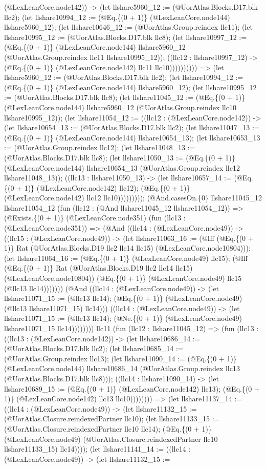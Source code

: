\documentclass[11pt]{article}
\begin{document}
(@LexLeanCore.node142)) -> (let llshare5960\_12 := (@UorAtlas.Blocks.D17.blk llc2); (let llshare10994\_12 := (@Eq.\{(0 + 1)\} (@LexLeanCore.node144) llshare5960\_12); (let llshare10646\_12 := (@UorAtlas.Group.reindex llc11); (let llshare10995\_12 := (@UorAtlas.Blocks.D17.blk llc8); (let llshare10997\_12 := (@Eq.\{(0 + 1)\} (@LexLeanCore.node144) llshare5960\_12 (@UorAtlas.Group.reindex llc11 llshare10995\_12)); ((llc12 : llshare10997\_12) -> (@Eq.\{(0 + 1)\} (@LexLeanCore.node142) llc11 llc10)))))))))) => (let llshare5960\_12 := (@UorAtlas.Blocks.D17.blk llc2); (let llshare10994\_12 := (@Eq.\{(0 + 1)\} (@LexLeanCore.node144) llshare5960\_12); (let llshare10995\_12 := (@UorAtlas.Blocks.D17.blk llc8); (let llshare11045\_12 := (@Eq.\{(0 + 1)\} (@LexLeanCore.node144) llshare5960\_12 (@UorAtlas.Group.reindex llc10 llshare10995\_12)); (let llshare11054\_12 := ((llc12 : (@LexLeanCore.node142)) -> (let llshare10654\_13 := (@UorAtlas.Blocks.D17.blk llc2); (let llshare11047\_13 := (@Eq.\{(0 + 1)\} (@LexLeanCore.node144) llshare10654\_13); (let llshare10653\_13 := (@UorAtlas.Group.reindex llc12); (let llshare11048\_13 := (@UorAtlas.Blocks.D17.blk llc8); (let llshare11050\_13 := (@Eq.\{(0 + 1)\} (@LexLeanCore.node144) llshare10654\_13 (@UorAtlas.Group.reindex llc12 llshare11048\_13)); ((llc13 : llshare11050\_13) -> (let llshare10657\_14 := (@Eq.\{(0 + 1)\} (@LexLeanCore.node142) llc12); (@Eq.\{(0 + 1)\} (@LexLeanCore.node142) llc12 llc10))))))))); (@And.casesOn.\{0\} llshare11045\_12 llshare11054\_12 (fun (llc12 : (@And llshare11045\_12 llshare11054\_12)) => (@Exists.\{(0 + 1)\} (@LexLeanCore.node351) (fun (llc13 : (@LexLeanCore.node351)) => (@And ((llc14 : (@LexLeanCore.node49)) -> ((llc15 : (@LexLeanCore.node49)) -> (let llshare11063\_16 := (@Iff (@Eq.\{(0 + 1)\} Rat (@UorAtlas.Blocks.D19 llc2 llc14 llc15) (@LexLeanCore.node10804))); (let llshare11064\_16 := (@Eq.\{(0 + 1)\} (@LexLeanCore.node49) llc15); (@Iff (@Eq.\{(0 + 1)\} Rat (@UorAtlas.Blocks.D19 llc2 llc14 llc15) (@LexLeanCore.node10804)) (@Eq.\{(0 + 1)\} (@LexLeanCore.node49) llc15 (@llc13 llc14))))))) (@And ((llc14 : (@LexLeanCore.node49)) -> (let llshare11071\_15 := (@llc13 llc14); (@Eq.\{(0 + 1)\} (@LexLeanCore.node49) (@llc13 llshare11071\_15) llc14))) ((llc14 : (@LexLeanCore.node49)) -> (let llshare11071\_15 := (@llc13 llc14); (@Ne.\{(0 + 1)\} (@LexLeanCore.node49) llshare11071\_15 llc14)))))))) llc11 (fun (llc12 : llshare11045\_12) => (fun (llc13 : ((llc13 : (@LexLeanCore.node142)) -> (let llshare10686\_14 := (@UorAtlas.Blocks.D17.blk llc2); (let llshare10685\_14 := (@UorAtlas.Group.reindex llc13); (let llshare11090\_14 := (@Eq.\{(0 + 1)\} (@LexLeanCore.node144) llshare10686\_14 (@UorAtlas.Group.reindex llc13 (@UorAtlas.Blocks.D17.blk llc8))); ((llc14 : llshare11090\_14) -> (let llshare10689\_15 := (@Eq.\{(0 + 1)\} (@LexLeanCore.node142) llc13); (@Eq.\{(0 + 1)\} (@LexLeanCore.node142) llc13 llc10)))))))) => (let llshare11137\_14 := ((llc14 : (@LexLeanCore.node49)) -> (let llshare11132\_15 := (@UorAtlas.Closure.reindexedPartner llc10); (let llshare11133\_15 := (@UorAtlas.Closure.reindexedPartner llc10 llc14); (@Eq.\{(0 + 1)\} (@LexLeanCore.node49) (@UorAtlas.Closure.reindexedPartner llc10 llshare11133\_15) llc14)))); (let llshare11141\_14 := ((llc14 : (@LexLeanCore.node49)) -> (let llshare11132\_15 := 
\end{document}
